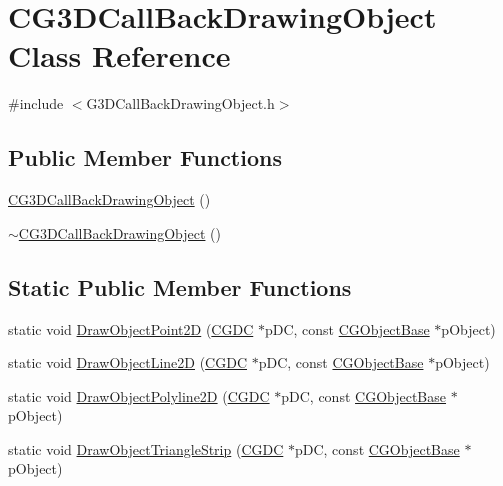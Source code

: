 \hypertarget{class_c_g3_d_call_back_drawing_object}{}\section{C\+G3\+D\+Call\+Back\+Drawing\+Object Class Reference}
\label{class_c_g3_d_call_back_drawing_object}


{\ttfamily \#include $<$G3\+D\+Call\+Back\+Drawing\+Object.\+h$>$}

\subsection*{Public Member Functions}
\begin{DoxyCompactItemize}
\item 
\hyperlink{class_c_g3_d_call_back_drawing_object_ab0a237dc2b3985507502db855df9824b}{C\+G3\+D\+Call\+Back\+Drawing\+Object} ()
\item 
\hyperlink{class_c_g3_d_call_back_drawing_object_ad0197dff32795f87fa15be99813cf4fb}{$\sim$\+C\+G3\+D\+Call\+Back\+Drawing\+Object} ()
\end{DoxyCompactItemize}
\subsection*{Static Public Member Functions}
\begin{DoxyCompactItemize}
\item 
static void \hyperlink{class_c_g3_d_call_back_drawing_object_aa72d4cc06138b16dd380a07d77d2299f}{Draw\+Object\+Point2\+D} (\hyperlink{class_c_g_d_c}{C\+G\+D\+C} $\ast$p\+D\+C, const \hyperlink{class_c_g_object_base}{C\+G\+Object\+Base} $\ast$p\+Object)
\item 
static void \hyperlink{class_c_g3_d_call_back_drawing_object_abd059e46f670b32103d19b3b32a011e9}{Draw\+Object\+Line2\+D} (\hyperlink{class_c_g_d_c}{C\+G\+D\+C} $\ast$p\+D\+C, const \hyperlink{class_c_g_object_base}{C\+G\+Object\+Base} $\ast$p\+Object)
\item 
static void \hyperlink{class_c_g3_d_call_back_drawing_object_a7364939486a9f4784f385be02e2cd238}{Draw\+Object\+Polyline2\+D} (\hyperlink{class_c_g_d_c}{C\+G\+D\+C} $\ast$p\+D\+C, const \hyperlink{class_c_g_object_base}{C\+G\+Object\+Base} $\ast$p\+Object)
\item 
static void \hyperlink{class_c_g3_d_call_back_drawing_object_aa65b5a80dd98f4238f5cb67cb1d47f46}{Draw\+Object\+Triangle\+Strip} (\hyperlink{class_c_g_d_c}{C\+G\+D\+C} $\ast$p\+D\+C, const \hyperlink{class_c_g_object_base}{C\+G\+Object\+Base} $\ast$p\+Object)
\end{DoxyCompactItemize}


